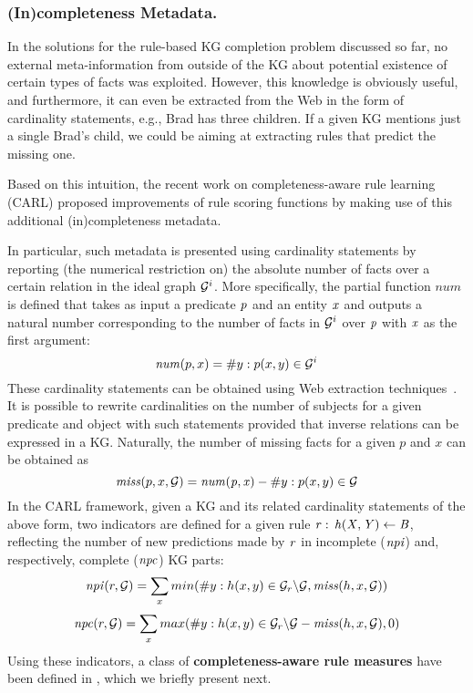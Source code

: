 \subsubsection{(In)completeness Metadata.}
In the solutions for the rule-based KG completion problem discussed so far, no external meta-information from outside of the KG about potential existence of certain types of facts was exploited. However, this knowledge is obviously useful, and furthermore, it can even be extracted from the Web in the form of cardinality statements, e.g., Brad has three children. If a given KG mentions just a single Brad's child, we could be aiming at extracting rules that predict the missing one.

Based on this intuition, the recent work on completeness-aware rule learning (CARL) \cite{carl} proposed improvements of rule scoring functions by making use of this additional (in)completeness metadata.

In particular, such metadata is presented using cardinality statements by reporting (the numerical restriction on) the absolute number of facts over a certain relation in the ideal graph $\mathcal{G}^i$. More specifically, the partial function $num$ is defined that takes as input a predicate $\mathit{p}$ and an entity $\mathit{x}$ and outputs a natural number corresponding to the number of facts in $\mathcal{G}^i$ over $\mathit{p}$ with $\mathit{x}$ as the first argument: 
\begin{equation}\label{eq:num}
\mathit{num}(p,x) = \# y : p(x,y) \in \mathcal{G}^i 
\end{equation}
These cardinality statements can be obtained using Web extraction techniques~\cite{cardinality-extraction-iswc-2016}.
It is possible to rewrite cardinalities on the number of subjects for a given predicate and object with such statements provided that inverse relations can be expressed in a KG.
Naturally, the number of missing facts for a given $p$ and $x$ can be obtained as
\[\mathit{miss}(p,x,\mathcal{G}) = \mathit{num(p,x)} - \#y : p(x,y) \in \mathcal{G}\]
In the CARL framework, given a KG and its related cardinality statements of the above form, two indicators are defined for a given rule $\mathit{r:\,h(X,Y)\leftarrow B}$, reflecting the number of new 
predictions made by $\mathit{r}$ in incomplete ($\mathit{npi}$) and, respectively, complete ($\mathit{npc}$) KG parts:
\begin{align*}
\mathit{npi}(r, \mathcal{G}) = \sum_x min(\#y: h(x,y)\in \mathcal{G}_r\backslash \mathcal{G}, \mathit{miss}(h,x,\mathcal{G}))
\end{align*}
\vspace{-\topsep}
\vspace{-\topsep}
\begin{align*}
\mathit{npc}(r, \mathcal{G}) = \sum_x max(\#y: h(x,y)\in\mathcal{G}_r\backslash \mathcal{G} - \mathit{miss}(h,x,\mathcal{G}), 0)
\end{align*}
Using these indicators, a class of \textbf{completeness-aware rule measures} have been defined in \cite{carl}, which we briefly present next.
% 

